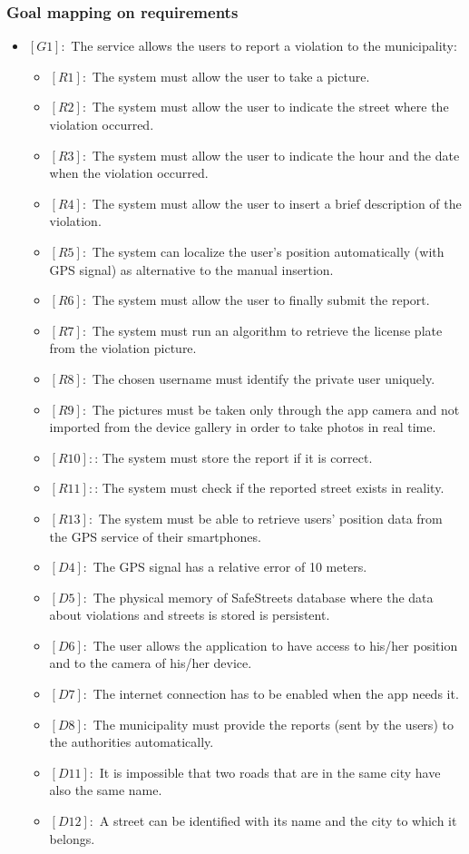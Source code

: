 \documentclass[titlepage]{article}
\begin{document}
\subsubsection{Goal mapping on requirements}
\begin{itemize}
 \item $[G1]:$ The service allows the users to report a violation to the municipality:
 \begin{itemize}
 	\item $[R1]:$ The system must allow the user to take a picture.
 	\item $[R2]:$ The system must allow the user to indicate the street where the violation occurred.
 	\item $[R3]:$ The system must allow the user to indicate the hour and the date when the violation occurred.
 	\item $[R4]:$ The system must allow the user to insert a brief description of the violation.
 	\item $[R5]:$ The system can localize the user's position automatically (with GPS signal) as alternative to the manual insertion.
 	\item $[R6]:$ The system must allow the user to finally submit the report.
 	\item $[R7]:$ The system must run an algorithm to retrieve the license plate from the violation picture.
 	\item $[R8]:$ The chosen username must identify the private user uniquely.
 	\item $[R9]:$ The pictures must be taken only through the app camera and not imported from the device gallery in order to take photos in real time.
 	\item $[R10]:$: The system must store the report if it is correct.
 	\item $[R11]:$: The system must check if the reported street exists in reality.
 	\item $[R13]:$ The system must be able to retrieve users' position data from the GPS service of their smartphones.
 	\item $[D4]:$ The GPS signal has a relative error of 10 meters.
 	\item $[D5]:$ The physical memory of SafeStreets database where the data about violations and streets is stored is persistent.
 	\item $[D6]:$ The user allows the application to have access to his/her position and to the camera of his/her device.
 	\item $[D7]:$ The internet connection has to be enabled when the app needs it.
 	\item $[D8]:$ The municipality must provide the reports (sent by the users) to the authorities automatically.
 	\item $[D11]:$ It is impossible that two roads that are in the same city have also the same name.
 	\item $[D12]:$ A street can be identified with its name and the city to which it belongs.


\end{itemize}
\end{itemize}
\end{document}
